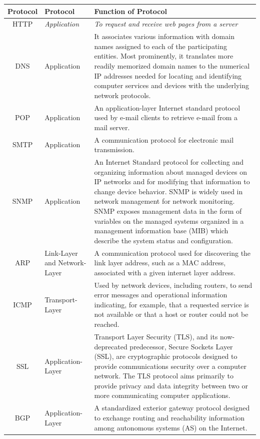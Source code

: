 \documentclass{article}
\begin{document}
\begin{center}
 \begin{longtable}{| c | m{8em} | m{30em} |} 
 \hline
 {\bf Protocol} & {\bf Protocol} & {\bf Function of Protocol} \\ [0.5ex]
 \hline\hline
HTTP & {\it Application} & 
{\it To request and receive web pages from a server} \\
 \hline
DNS & Application & 
It associates various information with domain names assigned to each of the participating entities. Most prominently, it translates more readily memorized domain names to the numerical IP addresses needed for locating and identifying computer services and devices with the underlying network protocols. \\
 \hline
POP & Application & 
An application-layer Internet standard protocol used by e-mail clients to retrieve e-mail from a mail server. \\
 \hline
SMTP & Application & 
A communication protocol for electronic mail transmission. \\
 \hline
SNMP & Application & 
An Internet Standard protocol for collecting and organizing information about managed devices on IP networks and for modifying that information to change device behavior. SNMP is widely used in network management for network monitoring. SNMP exposes management data in the form of variables on the managed systems organized in a management information base (MIB) which describe the system status and configuration. \\
 \hline
ARP & Link-Layer and Network-Layer & 
A communication protocol used for discovering the link layer address, such as a MAC address, associated with a given internet layer address. \\
 \hline
ICMP & Transport-Layer & 
Used by network devices, including routers, to send error messages and operational information indicating, for example, that a requested service is not available or that a host or router could not be reached. \\
 \hline
SSL & Application-Layer & 
Transport Layer Security (TLS), and its now-deprecated predecessor, Secure Sockets Layer (SSL), are cryptographic protocols designed to provide communications security over a computer network. The TLS protocol aims primarily to provide privacy and data integrity between two or more communicating computer applications. \\
 \hline
BGP & Application-Layer & 
A standardized exterior gateway protocol designed to exchange routing and reachability information among autonomous systems (AS) on the Internet. \\

\end{longtable}
\end{center}
\end{document}
